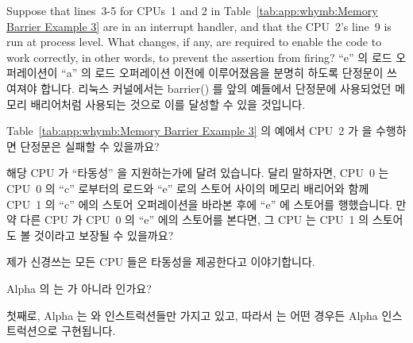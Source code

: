 \begin{enumerate}
	Suppose that lines~3-5 for CPUs~1 and 2 in
	Table~\ref{tab:app:whymb:Memory Barrier Example 3}
	are in an interrupt
	handler, and that the CPU~2's line~9 is run at process level.
	What changes, if any, are required to enable the code to work
	correctly, in other words, to prevent the assertion from firing?
	\fi
\QuickA{}
	``e'' 의 로드 오퍼레이션이 ``a'' 의 로드 오퍼레이션 이전에 이루어졌음을
	분명히 하도록 단정문이 쓰여져야 합니다.
	리눅스 커널에서는 barrier() 를 앞의 예들에서 단정문에 사용되었던 메모리
	배리어처럼 사용되는 것으로 이를 달성할 수 있을 것입니다.

\QuickQ{}
	Table~\ref{tab:app:whymb:Memory Barrier Example 3} 의 예에서 CPU~2 가
	 을 수행하면 단정문은 실패할 수 있을까요?

\QuickA{}
	해당 CPU 가 ``타동성'' 을 지원하는가에 달려 있습니다.
	달리 말하자면, CPU~0 는 CPU~0 의 ``c'' 로부터의 로드와 ``e'' 로의
	스토어 사이의 메모리 배리어와 함께 CPU~1 의 ``c'' 에의 스토어
	오퍼레이션을 바라본 후에 ``e'' 에 스토어를 행했습니다.
	만약 다른 CPU 가 CPU~0 의 ``e'' 에의 스토어를 본다면, 그 CPU 는 CPU~1
	의 스토어도 볼 것이라고 보장될 수 있을까요?

	제가 신경쓰는 모든 CPU 들은 타동성을 제공한다고 이야기합니다.

\QuickQ{}
	Alpha 의  는  가 아니라
	 인가요?

\QuickA{}
	첫째로, Alpha 는  와  인스트럭션들만 가지고 있고, 따라서
	 는 어떤 경우든 Alpha  인스트럭션으로 구현됩니다.


\end{enumerate}
